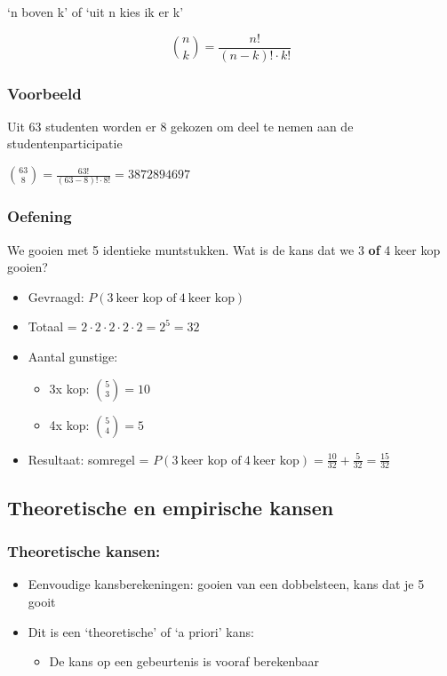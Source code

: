 \documentclass{article}
\begin{document}
`n boven k' of `uit n kies ik er k'

\begin{equation}
    \binom{n}{k} = \frac{n!}{(n-k)! \cdot k!}
\end{equation}

\subsubsection{Voorbeeld}

Uit 63 studenten worden er 8 gekozen om deel te nemen aan de studentenparticipatie

$\binom{63}{8} = \frac{63!}{(63-8)! \cdot 8!} = 3 872 894 697$


\subsubsection{Oefening}

We gooien met 5 identieke muntstukken. Wat is de kans dat we 3 \textbf{of} 4 keer kop gooien?

\begin{itemize}
    \item Gevraagd: $P(3\ \text{keer kop of}\ 4\ \text{keer kop})$
    \item Totaal = $2 \cdot 2 \cdot 2 \cdot 2 \cdot 2 = 2^5 = 32$
    \item Aantal gunstige:
    \begin{itemize}
        \item 3x kop: $\binom{5}{3} = 10$
        \item 4x kop: $\binom{5}{4} = 5$
    \end{itemize}
    \item Resultaat: somregel = $P(3\ \text{keer kop of}\ 4\ \text{keer kop}) = \frac{10}{32} + \frac{5}{32} = \frac{15}{32}$
\end{itemize}

\subsection{Theoretische en empirische kansen}

\subsubsection{Theoretische kansen:}

\begin{itemize}
    \item Eenvoudige kansberekeningen: gooien van een dobbelsteen, kans dat je 5 gooit
    \item Dit is een `theoretische' of `a priori' kans:
    \begin{itemize}
        \item De kans op een gebeurtenis is vooraf berekenbaar
    \end{itemize}
\end{itemize}
\end{document}
